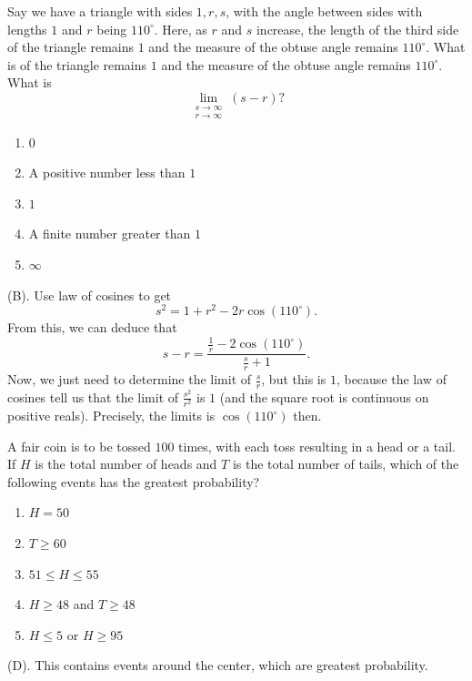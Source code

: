 \begin{exercise}
Say we have a triangle with sides $1,r,s$, with the angle between sides with 
lengths $1$ and $r$ being $110^{\circ}$. Here, as $r$ and $s$ increase, 
the length of the third side of the triangle remains $1$ and the measure 
of the obtuse angle remains $110^\circ$. What is
of the triangle remains $1$ and the measure of the obtuse angle remains
$110^\circ$. What is
\[
\lim_{\substack{s\to\infty\\r\to\infty}}(s-r)?
\]

\begin{enumerate}[label=(\Alph*)]
    \item $0$
    \item A positive number less than $1$
    \item $1$
    \item A finite number greater than $1$
    \item $\infty$
\end{enumerate}
\end{exercise}
\begin{solution}
(B). Use law of cosines to get
\[
s^2 = 1 + r^2 - 2r \cos (110^{\circ}).
\]
From this, we can deduce that 
\[
s - r = \frac{\frac{1}{r} - 2 \cos(110^{\circ})}{\frac{s}{r} + 1}.
\]
Now, we just need to determine the limit of $\frac{s}{r}$, but this is $1$, because
the law of cosines tell us that the limit of $\frac{s^2}{r^2}$ is $1$ (and the square 
root is continuous on positive reals). Precisely, the limits is $\cos(110^{\circ})$ then.
\end{solution}

\begin{exercise}
A fair coin is to be tossed $100$ times, with each toss resulting in a head or a tail. 
If $H$ is the total number of heads and $T$ is the total number of tails, which of the following events has the greatest probability?
\begin{enumerate}[label=(\Alph*)]
    \item $H=50$
    \item $T\geq 60$
    \item $51\leq H\leq 55$
    \item $H\geq 48$ and $T\geq 48$
    \item $H\leq 5$ or $H\geq 95$
\end{enumerate}
\end{exercise}
\begin{solution}
(D). This contains events around the center, which are greatest probability.
\end{solution}

